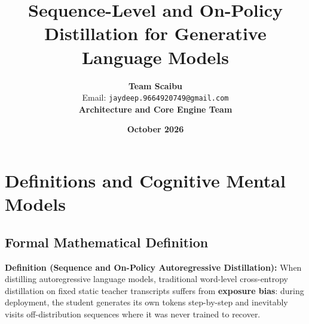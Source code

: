 \documentclass[11pt,a4paper]{article}
\title{\textbf{Sequence-Level and On-Policy Distillation for Generative Language Models}}
\author{\textbf{Team Scaibu} \\ \small Email: \texttt{jaydeep.9664920749@gmail.com} \\ \small \textbf{Architecture and Core Engine Team}}
\date{\textbf{October 2026}}
\theoremstyle{definition}
\begin{document}
\maketitle

\section{Definitions and Cognitive Mental Models}

\subsection{Formal Mathematical Definition}
\textbf{Definition (Sequence and On-Policy Autoregressive Distillation):}
When distilling autoregressive language models, traditional word-level cross-entropy distillation on fixed static teacher transcripts suffers from \textbf{exposure bias}: during deployment, the student generates its own tokens step-by-step and inevitably visits off-distribution sequences where it was never trained to recover.
\end{document}
